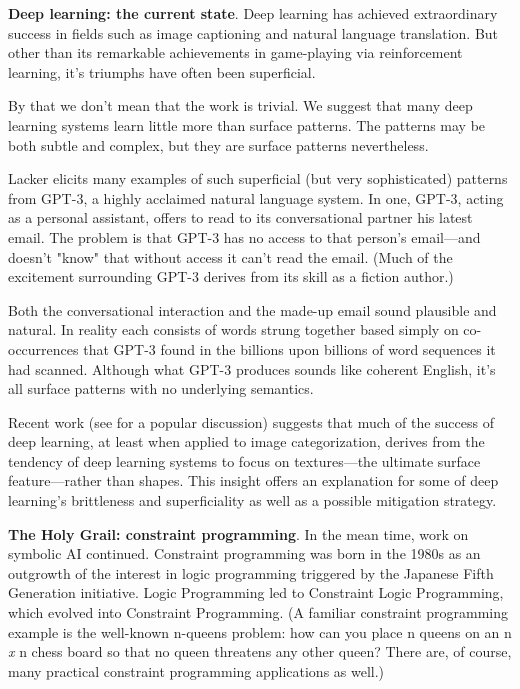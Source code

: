 \smallv\noindent\textbf{Deep learning: the current state}. Deep learning has achieved extraordinary success in fields such as image captioning and natural language translation.\cite{garnelo2019reconciling} But other than its remarkable achievements in game-playing via reinforcement learning\cite{silver2018general}, it's triumphs have often been superficial. 

By that we don't mean that the work is trivial. We suggest that many deep learning systems learn little more than surface patterns. The patterns may be both subtle and complex, but they are surface patterns nevertheless.

Lacker\cite{lacker-gpt3} elicits many examples of such superficial (but very sophisticated) patterns from GPT-3\cite{brown2020language}, a highly acclaimed natural language system. In one, GPT-3, acting as a personal assistant, offers to read to its conversational partner his latest email. The problem is that GPT-3 has no access to that person's email---and doesn't "know" that without access it can't read the email. (Much of the excitement surrounding GPT-3 derives from its skill as a fiction author.) 

Both the conversational interaction and the made-up email sound plausible and natural. In reality each consists of words strung together based simply on co-occurrences that GPT-3 found in the billions upon billions of word sequences it had scanned. Although what GPT-3 produces sounds like coherent English, it's all surface patterns with no underlying semantics.

Recent work\cite{geirhos2018imagenet} (see \cite{Cepelewicz-textures-2020} for a popular discussion) suggests that much of the success of deep learning, at least when applied to image categorization, derives from the tendency of deep learning systems to focus on textures---the ultimate surface feature---rather than shapes.  This insight offers an explanation for some of deep learning's brittleness and superficiality as well as a possible mitigation strategy.

\smallv\noindent\textbf{The Holy Grail: constraint programming}. In the mean time, work on symbolic AI continued. Constraint programming was born in the 1980s as an outgrowth of the interest in logic programming triggered by the Japanese Fifth Generation initiative.\cite{shapiro1983fifth} Logic Programming led to Constraint Logic Programming, which evolved into Constraint Programming. (A familiar constraint programming example is the well-known n-queens problem: how can you place n queens on an n \textit{x} n chess board so that no queen threatens any other queen? There are, of course, many practical constraint programming applications as well.)

